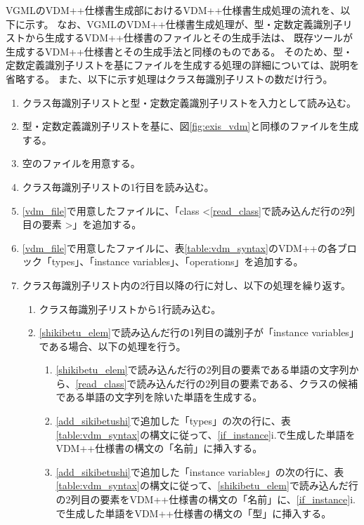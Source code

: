 VGMLのVDM++仕様書生成部におけるVDM++仕様書生成処理の流れを、以下に示す。
なお、VGMLのVDM++仕様書生成処理が、型・定数定義識別子リストから生成するVDM++仕様書のファイルとその生成手法は、
既存ツールが生成するVDM++仕様書とその生成手法と同様のものである。
そのため、型・定数定義識別子リストを基にファイルを生成する処理の詳細については、説明を省略する。
また、以下に示す処理はクラス毎識別子リストの数だけ行う。

\begin{enumerate}
    \item クラス毎識別子リストと型・定数定義識別子リストを入力として読み込む。
    \item 型・定数定義識別子リストを基に、図\ref{fig:exis_vdm}と同様のファイルを生成する。
    \label{katateisu_vdm}
    \item 空のファイルを用意する。
    \label{vdm_file}
    \item クラス毎識別子リストの1行目を読み込む。
    \label{read_class}
    \item \ref{vdm_file}で用意したファイルに、「class \textless \ref{read_class}で読み込んだ行の2列目の要素 \textgreater」を追加する。
    \item \ref{vdm_file}で用意したファイルに、表\ref{table:vdm_syntax}のVDM++の各ブロック「types」、「instance variables」、「operations」を追加する。
    \label{add_sikibetushi}
    \item クラス毎識別子リスト内の2行目以降の行に対し、以下の処理を繰り返す。
        \begin{enumerate}
            \item クラス毎識別子リストから1行読み込む。
            \label{shikibetu_elem}
            \item \ref{shikibetu_elem}で読み込んだ行の1列目の識別子が「instance variables」である場合、以下の処理を行う。
            \label{if_instance}
                \begin{enumerate}
                    \item \ref{shikibetu_elem}で読み込んだ行の2列目の要素である単語の文字列から、\ref{read_class}で読み込んだ行の2列目の要素である、クラスの候補である単語の文字列を除いた単語を生成する。
                    \label{read_kata}
                    \item \ref{add_sikibetushi}で追加した「types」の次の行に、表{\ref{table:vdm_syntax}}の構文に従って、\ref{if_instance}i.で生成した単語をVDM++仕様書の構文の「名前」に挿入する。
                    \item \ref{add_sikibetushi}で追加した「instance variables」の次の行に、表\ref{table:vdm_syntax}の構文に従って、\ref{shikibetu_elem}で読み込んだ行の2列目の要素をVDM++仕様書の構文の「名前」に、\ref{if_instance}i.で生成した単語をVDM++仕様書の構文の「型」に挿入する。

\end{enumerate}
\end{enumerate}
\end{enumerate}
